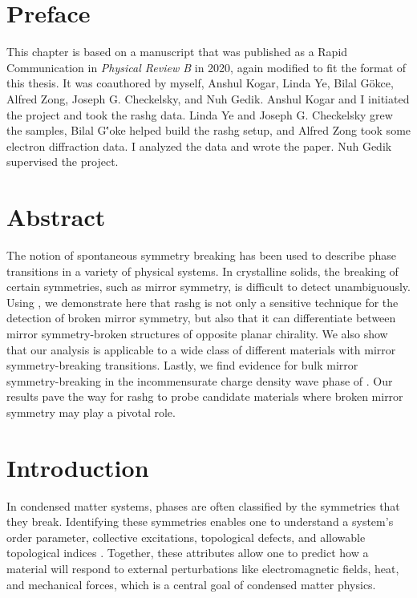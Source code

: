 \section{Preface}

This chapter is based on a manuscript that was published as a Rapid Communication in \textit{Physical Review B} in 2020, again modified to fit the format of this thesis.
It was coauthored by myself, Anshul Kogar, Linda Ye, Bilal G\"{o}kce, Alfred Zong, Joseph G. Checkelsky, and Nuh Gedik.
Anshul Kogar and I initiated the project and took the \gls{rashg} data.
Linda Ye and Joseph G. Checkelsky grew the samples, Bilal G\''oke helped build the \gls{rashg} setup, and Alfred Zong took some electron diffraction data.
I analyzed the data and wrote the paper.
Nuh Gedik supervised the project.

\section{Abstract}

The notion of spontaneous symmetry breaking has been used to describe phase transitions in a variety of physical systems.
In crystalline solids, the breaking of certain symmetries, such as mirror symmetry, is difficult to detect unambiguously.
Using \tastwo, we demonstrate here that \gls{rashg} is not only a sensitive technique for the detection of broken mirror symmetry, but also that it can differentiate between mirror symmetry-broken structures of opposite planar chirality.
We also show that our analysis is applicable to a wide class of different materials with mirror symmetry-breaking transitions.
Lastly, we find evidence for bulk mirror symmetry-breaking in the incommensurate charge density wave phase of \tastwo.
Our results pave the way for \gls{rashg} to probe candidate materials where broken mirror symmetry may play a pivotal role.

\section{Introduction}

In condensed matter systems, phases are often classified by the symmetries that they break.
Identifying these symmetries enables one to understand a system's order parameter, collective excitations, topological defects, and allowable topological indices \citep{sethna, thouless}.
Together, these attributes allow one to predict how a material will respond to external perturbations like electromagnetic fields, heat, and mechanical forces, which is a central goal of condensed matter physics.

